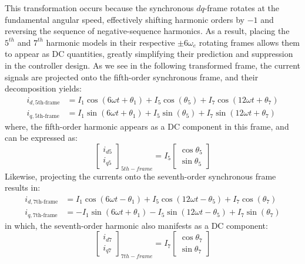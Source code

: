 This transformation occurs because the synchronous \(dq\)-frame rotates at the fundamental angular speed, effectively shifting harmonic orders by \(-1\) and reversing the sequence of negative-sequence harmonics. As a result, placing the $5^{th}$ and $7^{th}$ harmonic models in their respective \(\pm 6\omega_e\) rotating frames allows them to appear as DC quantities, greatly simplifying their prediction and suppression in the controller design. As we see in the following transformed frame, the current signals are projected onto the fifth-order synchronous frame, and their decomposition yields:
\begin{align}
i_{d,5\text{th-frame}} &= I_1 \cos(6\omega t + \theta_1) + I_5 \cos(\theta_5) + I_7 \cos(12\omega t + \theta_7) \\
i_{q,5\text{th-frame}} &= I_1 \sin(6\omega t + \theta_1) + I_5 \sin(\theta_5) + I_7 \sin(12\omega t + \theta_7)
\end{align}
where, the fifth-order harmonic appears as a DC component in this frame, and can be expressed as:
\begin{equation}
\begin{bmatrix}
i_{d5} \\
i_{q5}
\end{bmatrix}_{5th-frame}
= I_5
\begin{bmatrix}
\cos \theta_5 \\
\sin \theta_5
\end{bmatrix}
\end{equation}
Likewise, projecting the currents onto the seventh-order synchronous frame results in:
\begin{equation}
\begin{aligned}
i_{d,7\text{th-frame}} &= I_1 \cos(6\omega t - \theta_1) + I_5 \cos(12\omega t - \theta_5) + I_7 \cos(\theta_7) \\
i_{q,7\text{th-frame}} &= -I_1 \sin(6\omega t + \theta_1) - I_5 \sin(12\omega t - \theta_5) + I_7 \sin(\theta_7)
\end{aligned}
\end{equation}
in which, the seventh-order harmonic also manifests as a DC component:
\begin{equation}
\begin{bmatrix}
i_{d7} \\
i_{q7}
\end{bmatrix}_{7th-frame}
= I_7
\begin{bmatrix}
\cos \theta_7 \\
\sin \theta_7
\end{bmatrix}
\end{equation}
